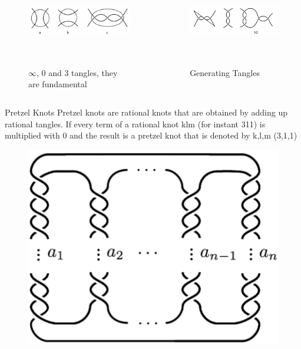 \begin{frame}
\begin{columns}[T]
\begin{column}{.48\textwidth}
\begin{figure}
    \centering
    \includegraphics[width=0.9\linewidth,height=4cm]{images/basictangles.png}
    \caption{$\infty$, 0 and 3 tangles, they are \centering fundamental}
    \label{basictangles}
\end{figure}
\cite{adams2004knot}
\end{column}
\begin{column}{.48\textwidth}
\begin{figure}[h]
    \centering
    \includegraphics[width=0.9\linewidth,height=4cm]{images/tangleproduce.png}
    \caption{Generating Tangles}
    \label{generating}
\end{figure}
\end{column}
\end{columns}
\end{frame}
\begin{frame}{Pretzel Knots}
Pretzel knots are rational knots that are obtained by adding up rational tangles. If every term of a rational knot klm (for instant 311) is multiplied with 0 and the result is a pretzel knot that is denoted by k,l,m (3,1,1)
\begin{figure}
    \centering
    \includegraphics[width=0.4\linewidth]{images/pretzel.png}
    \label{pretzel}
    \cite{article2}
\end{figure}
\end{frame}
